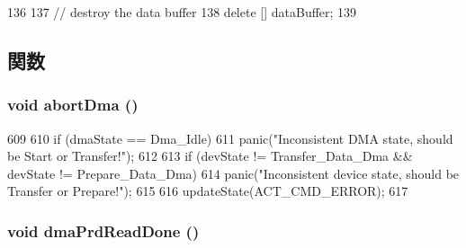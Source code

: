 \begin{DoxyCode}
136 {
137     // destroy the data buffer
138     delete [] dataBuffer;
139 }
\end{DoxyCode}


\subsection{関数}
\hypertarget{classIdeDisk_a477c235c4d75b02347129c86b67161ea}{
\subsubsection[{abortDma}]{\setlength{\rightskip}{0pt plus 5cm}void abortDma ()}}
\label{classIdeDisk_a477c235c4d75b02347129c86b67161ea}



\begin{DoxyCode}
609 {
610     if (dmaState == Dma_Idle)
611         panic("Inconsistent DMA state, should be Start or Transfer!");
612 
613     if (devState != Transfer_Data_Dma && devState != Prepare_Data_Dma)
614         panic("Inconsistent device state, should be Transfer or Prepare!\n");
615 
616     updateState(ACT_CMD_ERROR);
617 }
\end{DoxyCode}
\hypertarget{classIdeDisk_a251a4f7092f0f261661c759eb4cdbd9b}{
\subsubsection[{dmaPrdReadDone}]{\setlength{\rightskip}{0pt plus 5cm}void dmaPrdReadDone ()}}
\label{classIdeDisk_a251a4f7092f0f261661c759eb4cdbd9b}



